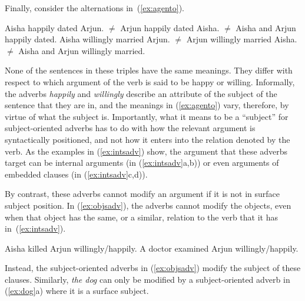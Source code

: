 \documentclass[twoside, 12pt]{article}
\begin{document}
Finally, consider the alternations in~(\ref{ex:agento}).
\begin{exe}
\raggedright
  \ex \label{ex:agento}
  \begin{xlist}
    \ex Aisha happily dated Arjun. $\neq$ Arjun happily dated Aisha. $\neq$ Aisha and Arjun happily dated.
    \ex Aisha willingly married Arjun. $\neq$ Arjun willingly married Aisha. $\neq$ Aisha and Arjun willingly married.
  \end{xlist}
\end{exe}
None of the sentences in these triples have the same meanings. They differ with respect to which argument of the verb is said to be happy or willing. Informally, the adverbs \textit{happily} and \textit{willingly} describe an attribute of the subject of the sentence that they are in, and the meanings in (\ref{ex:agento}) vary, therefore, by virtue of what the subject is. Importantly, what it means to be a ``subject'' for subject-oriented adverbs has to do with how the relevant argument is syntactically positioned, and not how it enters into the relation denoted by the verb. As the examples in (\ref{ex:intsadv}) show, the argument that these adverbs target can be internal arguments (in (\ref{ex:intsadv}a,b)) or even arguments of embedded clauses (in (\ref{ex:intsadv}c,d)).
\begin{exe}
\raggedright
  \ex \label{ex:intsadv}
  \begin{xlist}
  \end{xlist}
\end{exe}
By contrast, these adverbs cannot modify an argument if it is not in surface subject position. In (\ref{ex:objsadv}), the adverbs cannot modify the objects, even when that object has the same, or a similar, relation to the verb that it has in~(\ref{ex:intsadv}).
\begin{exe}
\raggedright
  \ex \label{ex:objsadv}
  \begin{xlist}
    \ex Aisha killed Arjun willingly/happily.
    \ex A doctor examined Arjun willingly/happily.
  \end{xlist}
\end{exe}
Instead, the subject-oriented adverbs in (\ref{ex:objsadv}) modify the subject of these clauses. Similarly, \textit{the dog} can only be modified by a subject-oriented adverb in (\ref{ex:dog}a) where it is a surface subject.
\end{document}
